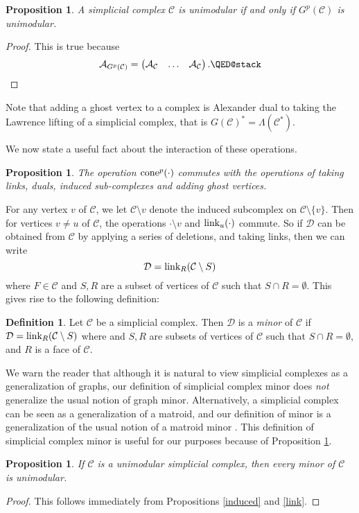 \documentclass[letterpaper,12pt]{amsart}
\theoremstyle{plain}
\newtheorem{prop}[thm]{Proposition}
\theoremstyle{definition}
\newtheorem{defn}[thm]{Definition}
\theoremstyle{remark}
\newcommand{\calc}{\mathcal{C}}
\newcommand{\link}{\textnormal{link}}
\newcommand{\cone}{\textnormal{cone}}
\begin{document}
\begin{prop}\label{ghost}
	A simplicial complex $\mathcal{C}$ is unimodular if and only if $G^p(\mathcal{C})$ is unimodular.
\end{prop}
\begin{proof}
	This is true because
	\[
		\mathcal{A}_{G^p(\mathcal{C})} = \begin{pmatrix}\mathcal{A}_{\mathcal{C}} & \dots & \mathcal{A}_{\mathcal{C}}\end{pmatrix}. \qedhere
	\]
\end{proof}

Note that adding a ghost vertex to a complex is Alexander dual to
taking the Lawrence lifting of a simplicial complex, that is
$G(\calc)^{*}  =  \Lambda(\calc^{*})$. 

We now state a useful fact about the interaction of these operations.
\begin{prop}\label{commutes}
	The operation $\cone^p(\cdot)$ commutes with the operations of taking links, duals, induced sub-complexes and adding ghost vertices.
\end{prop}

For any vertex $v$ of $\mathcal{C}$, we let $\mathcal{C}\setminus v$ denote the induced subcomplex on $\mathcal{C}\setminus\{v\}$.
Then for vertices $v\neq u$ of $\mathcal{C}$, the operations $\cdot\setminus v$ and $\link_u(\cdot)$ commute.
So if $\mathcal{D}$ can be obtained from $\mathcal{C}$ by applying a series of deletions, and taking links,
then we can write
\[
	\mathcal{D} = \link_R(\mathcal{C}\setminus S)
\]
where $F \in \mathcal{C}$ and $S,R$ are a subset of vertices of $\mathcal{C}$ such that $S \cap R = \emptyset$.
This gives rise to the following definition:

\begin{defn}\label{def:minor}
	Let $\mathcal{C}$ be a simplicial complex. Then $\mathcal{D}$ is a \emph{minor} of $\mathcal{C}$
	if $\mathcal{D} = \link_R(\mathcal{C}\setminus S)$ where
	and $S,R$ are subsets of vertices of $\mathcal{C}$ such that $S \cap R = \emptyset$,
	and $R$ is a face of $\calc$.
\end{defn}

{ We warn the reader that although it is natural to view simplicial complexes as a generalization of graphs,
our definition of simplicial complex minor does \emph{not} generalize the usual notion of graph minor.
Alternatively, a simplicial complex can be seen as a generalization of a matroid,
and our definition of minor is a generalization of the usual notion of 
a matroid minor \cite{kaiser2009}.
This definition of simplicial complex minor is useful for our 
purposes because of Proposition \ref{minor}.
}
\begin{prop}\label{minor}
	If $\mathcal{C}$ is a unimodular simplicial complex, then every minor of $\mathcal{C}$ is unimodular.
\end{prop}
\begin{proof}
	This follows immediately from Propositions \ref{induced} and \ref{link}.
\end{proof}
\end{document}
